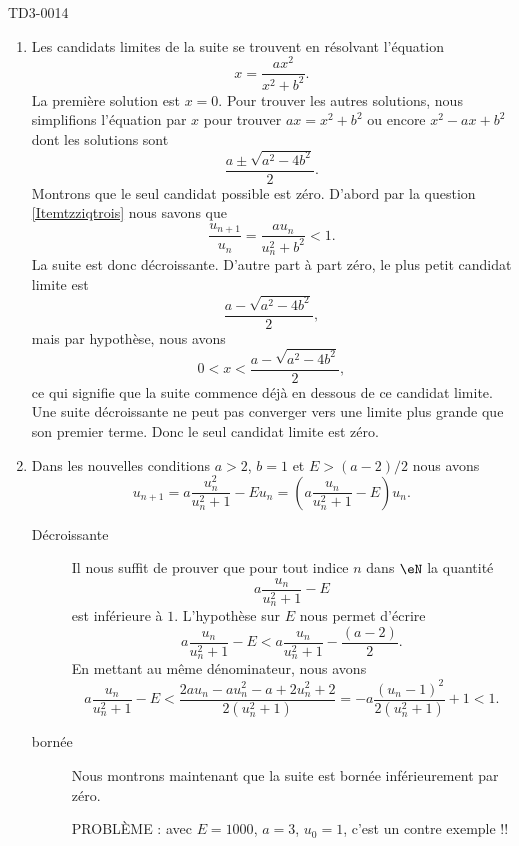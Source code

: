 \begin{corrige}{TD3-0014}
\begin{enumerate}
\item
    Les candidats limites de la suite se trouvent en résolvant l'équation
    \begin{equation}
        x=\frac{ ax^2 }{ x^2+b^2 }.
    \end{equation}
    La première solution est \( x=0\). Pour trouver les autres solutions, nous simplifions l'équation par \( x\) pour trouver \( ax=x^2+b^2\) ou encore \( x^2-ax+b^2\) dont les solutions sont
    \begin{equation}
        \frac{ a\pm\sqrt{a^2-4b^2} }{ 2 }.
    \end{equation}
    Montrons que le seul candidat possible est zéro. D'abord par la question \ref{Itemtzziqtrois} nous savons que
    \begin{equation}
        \frac{ u_{n+1} }{ u_n }=\frac{ a u_{n} }{ u_n^2+b^2 }<1.
    \end{equation}
    La suite est donc décroissante. D'autre part à part zéro, le plus petit candidat limite est 
    \begin{equation}
        \frac{ a-\sqrt{a^2-4b^2} }{ 2 },
    \end{equation}
    mais par hypothèse, nous avons
    \begin{equation}
        0<x<\frac{ a-\sqrt{a^2-4b^2} }{ 2 },
    \end{equation}
    ce qui signifie que la suite commence déjà en dessous de ce candidat limite. Une suite décroissante ne peut pas converger vers une limite plus grande que son premier terme. Donc le seul candidat limite est zéro.

\item Dans les nouvelles conditions $a>2$, $b=1$ et $E> (a-2)/2$ nous avons
  \begin{equation}
    	u_{n+1}=a\frac{ u_n^2 }{ u_n^2+1 }-Eu_n= \left(a\frac{ u_n }{ u_n^2+1 }-E\right)u_n.
  \end{equation}
  \begin{description}
      \item[Décroissante] 
Il nous suffit de prouver que pour tout indice $n$ dans $\eN$ la quantité 
\[
a\frac{ u_n }{ u_n^2+1 }-E
\]
est inférieure à $1$. L'hypothèse sur $E$ nous permet d'écrire
\[
  a\frac{ u_n }{ u_n^2+1 }-E<  a\frac{ u_n }{ u_n^2+1 }-\frac{(a-2)}{2}.
\]
En mettant au même dénominateur, nous avons
\begin{equation}
    a\frac{ u_n }{ u_n^2+1 }-E<\frac{ 2au_n-au_n^2-a+2u_n^2+2 }{ 2(u_n^2+1) }=-a\frac{ (u_n-1)^2 }{ 2(u_n^2+1) }+1<1.
\end{equation}

        \item[bornée]
            Nous montrons maintenant que la suite est bornée inférieurement par zéro.

            PROBLÈME : avec $E=1000$, \( a=3\), \( u_0=1\), c'est un contre exemple !!

  \end{description}

  \end{enumerate}

\end{corrige}
